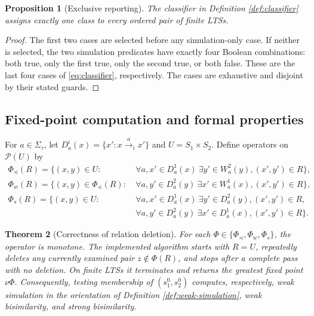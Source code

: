 \documentclass[JMCS,submit]{resources/ISRP}
\newtheorem{theorem}{Theorem}[section]
\newtheorem{proposition}[theorem]{Proposition}
\theoremstyle{definition}
\theoremstyle{remark}
\numberwithin{equation}{section}
\newcommand{\TAU}{\tau}
\newcommand{\powerset}{\mathcal{P}}
\begin{document}
\begin{proposition}[Exclusive reporting]\label{prop:classifier}
The classifier in Definition \ref{def:classifier} assigns exactly one class to
every ordered pair of finite LTSs.
\end{proposition}

\begin{proof}
The first two cases are selected before any simulation-only case. If neither is
selected, the two simulation predicates have exactly four Boolean combinations:
both true, only the first true, only the second true, or both false. These are the
last four cases of \eqref{eq:classifier}, respectively. The cases are exhaustive
and disjoint by their stated guards.
\end{proof}

\subsection{Fixed-point computation and formal properties}
\label{sec:fixed-point}

For $a\in\Sigma_{\TAU}$, let $D_a^i(x)=\{x':x\xrightarrow{a}_i x'\}$ and
$U=S_1\times S_2$. Define operators on $\powerset(U)$ by
\begin{align}
\Phi_{\preceq}(R)=\{(x,y)\in U:
 &\ \forall a,x'\in D_a^1(x)\ \exists y'\in W_a^2(y),
 (x',y')\in R\},\label{eq:sim-operator}\\
\Phi_w(R)=\{(x,y)\in\Phi_{\preceq}(R):
 &\ \forall a,y'\in D_a^2(y)\ \exists x'\in W_a^1(x),
 (x',y')\in R\},\label{eq:weak-bisim-operator}\\
\Phi_s(R)=\{(x,y)\in U:
 &\ \forall a,x'\in D_a^1(x)\ \exists y'\in D_a^2(y),
 (x',y')\in R,\nonumber\\
 &\ \forall a,y'\in D_a^2(y)\ \exists x'\in D_a^1(x),
 (x',y')\in R\}.\label{eq:strong-bisim-operator}
\end{align}

\begin{theorem}[Correctness of relation deletion]\label{thm:fixed-point}
For each $\Phi\in\{\Phi_{\preceq},\Phi_w,\Phi_s\}$, the operator is monotone.
The implemented algorithm starts with $R=U$, repeatedly deletes any currently
examined pair $z\notin\Phi(R)$, and stops after a complete pass with no deletion.
On finite LTSs it terminates and returns the greatest fixed point $\nu\Phi$.
Consequently, testing membership of $(s_1^0,s_2^0)$ computes, respectively,
weak simulation in the orientation of Definition \ref{def:weak-simulation}, weak
bisimilarity, and strong bisimilarity.
\end{theorem}
\end{document}
